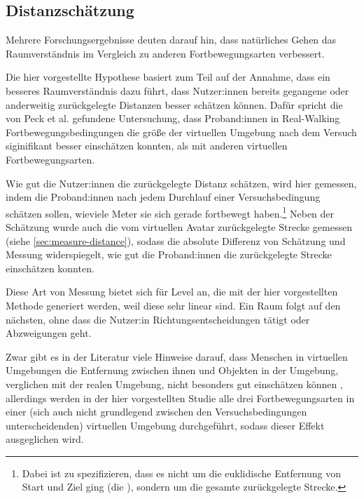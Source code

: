         \subsection{Distanzschätzung}
            Mehrere Forschungsergebnisse deuten darauf hin, dass natürliches Gehen das Raumverständnis im Vergleich zu anderen Fortbewegungsarten verbessert. \cite{langbehn-vergleich-2018,peck-vergleich-2011, walking-improves-map-building} %

            Die hier vorgestellte Hypothese basiert zum Teil auf der Annahme, dass ein besseres Raumverständnis dazu führt, dass Nutzer:innen bereits gegangene oder anderweitig zurückgelegte Distanzen besser schätzen können. Dafür spricht die von Peck et al. \cite{peck-vergleich-2011} gefundene Untersuchung, dass Proband:innen in Real-Walking Fortbewegungsbedingungen die größe der virtuellen Umgebung nach dem Versuch siginifikant besser einschätzen konnten, als mit anderen virtuellen Fortbewegungsarten.

            Wie gut die Nutzer:innen die zurückgelegte Distanz schätzen, wird hier gemessen, indem die Proband:innen nach jedem Durchlauf einer Versuchsbedingung schätzen sollen, wieviele Meter sie sich gerade fortbewegt haben.\footnote{Dabei ist zu spezifizieren, dass es nicht um die euklidische Entfernung von Start und Ziel ging (die ), sondern um die gesamte zurückgelegte Strecke.}
            Neben der Schätzung wurde auch die vom virtuellen Avatar zurückgelegte Strecke gemessen (siehe \autoref{sec:measure-distance}), sodass die absolute Differenz von Schätzung und Messung widerspiegelt, wie gut die Proband:innen die zurückgelegte Strecke einschätzen konnten.

            Diese Art von Messung bietet sich für Level an, die mit der hier vorgestellten Methode generiert werden, weil diese sehr linear sind. Ein Raum folgt auf den nächsten, ohne dass die Nutzer:in Richtungsentscheidungen tätigt oder Abzweigungen geht.

            Zwar gibt es in der Literatur viele Hinweise darauf, dass Menschen in virtuellen Umgebungen die Entfernung zwischen ihnen und Objekten in der Umgebung, verglichen mit der realen Umgebung,  nicht besonders gut einschätzen können \cite{meta-distance-perception, bruder-distance}, %
            allerdings werden in der hier vorgestellten Studie alle drei Fortbewegungsarten in einer (sich auch nicht grundlegend zwischen den Versuchsbedingungen unterscheidenden) virtuellen Umgebung durchgeführt, sodass dieser Effekt ausgeglichen wird.


